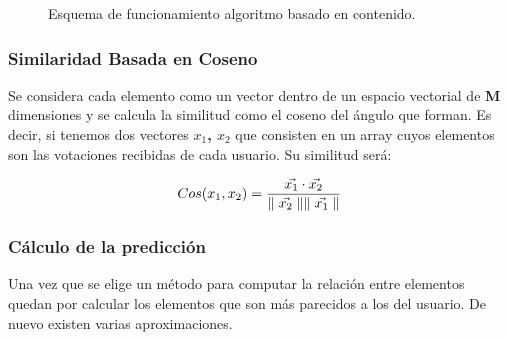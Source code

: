 \documentclass[12pt,letterpaper,oneside] {memoir}
\begin{document}
\begin{figure}[H]
 \centering 
{} \caption{Esquema de funcionamiento algoritmo basado en contenido.} 
 \label{fig:esquemaFC} 
\end{figure}

\subsubsection{Similaridad Basada en Coseno}

Se considera cada elemento como un vector dentro de un espacio vectorial de \textbf{M} dimensiones y se calcula la similitud como el coseno del ángulo que forman. Es decir, si tenemos dos vectores \textbf{$x_1$, $x_2$} que consisten en un array cuyos elementos son las votaciones recibidas de cada usuario. Su similitud será:

\begin{equation}
\displaystyle Cos(x_1,x_2)={\vec{x_1} \cdot  \vec{x_2} \over \parallel \vec{x_2} \parallel  \parallel \vec{x_1} \parallel} 
\end{equation}

\subsubsection{Cálculo de la predicción}

Una vez que se elige un método para computar la relación entre elementos quedan por calcular los elementos que son más parecidos a los del usuario. De nuevo existen varias aproximaciones.
\end{document}
